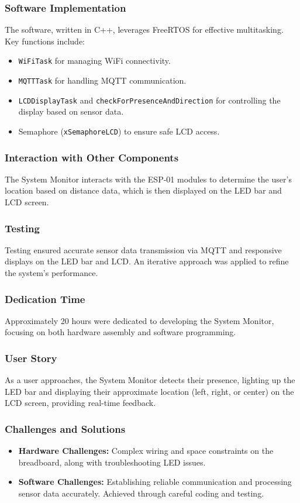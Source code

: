 \documentclass{article}
\begin{document}
\subsubsection{Software Implementation}
The software, written in C++, leverages FreeRTOS for effective multitasking. Key functions include:
\begin{itemize}
    \item \texttt{WiFiTask} for managing WiFi connectivity.
    \item \texttt{MQTTTask} for handling MQTT communication.
    \item \texttt{LCDDisplayTask} and \texttt{checkForPresenceAndDirection} for controlling the display based on sensor data.
    \item Semaphore (\texttt{xSemaphoreLCD}) to ensure safe LCD access.
\end{itemize}

\subsubsection{Interaction with Other Components}
The System Monitor interacts with the ESP-01 modules to determine the user's location based on distance data, which is then displayed on the LED bar and LCD screen.

\subsubsection{Testing}
Testing ensured accurate sensor data transmission via MQTT and responsive displays on the LED bar and LCD. An iterative approach was applied to refine the system's performance.

\subsubsection{Dedication Time}
Approximately 20 hours were dedicated to developing the System Monitor, focusing on both hardware assembly and software programming.

\subsubsection{User Story}
As a user approaches, the System Monitor detects their presence, lighting up the LED bar and displaying their approximate location (left, right, or center) on the LCD screen, providing real-time feedback.

\subsubsection{Challenges and Solutions}
\begin{itemize}
    \item \textbf{Hardware Challenges:} Complex wiring and space constraints on the breadboard, along with troubleshooting LED issues.
    \item \textbf{Software Challenges:} Establishing reliable communication and processing sensor data accurately. Achieved through careful coding and testing.
\end{itemize}
\end{document}
